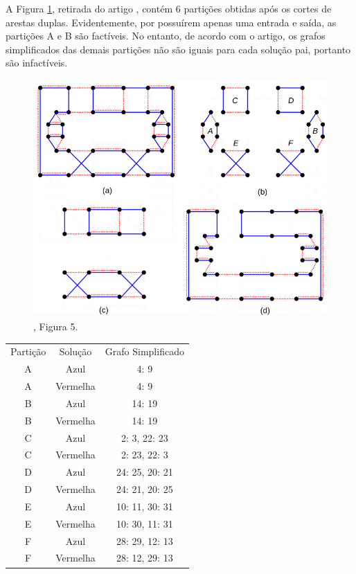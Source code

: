 \documentclass[
	article,			%
	11pt,				%
	oneside,			%
	a4paper,			%
	english,			%
	brazil,				%
	sumario=tradicional
	]{abntex2}
\begin{document}
A Figura \ref{fig-2}, retirada do artigo , contém 6 partições obtidas após os cortes de arestas duplas. Evidentemente, por possuírem apenas uma entrada e saída, as partições A e B são factíveis. No entanto, de acordo com o artigo, os grafos simplificados das demais partições não são iguais para cada solução pai, portanto são infactíveis.

\begin{figure}[tbph!]
	\centering
	\includegraphics[width=0.7\linewidth]{fig-2}
	\caption{, Figura 5.}
	\label{fig-2}
\end{figure}

\begin{table}[tbph!]
	\centering
	\label{tab-1}
	\begin{tabular}{ccc}
		Partição & Solução & Grafo Simplificado \\
		A & Azul & 4: 9 \\
		A & Vermelha & 4: 9 \\
		B & Azul & 14: 19 \\
		B & Vermelha & 14: 19 \\
		C & Azul & 2: 3, 22: 23 \\
		C & Vermelha & 2: 23, 22: 3 \\
		D & Azul & 24: 25, 20: 21 \\
		D & Vermelha & 24: 21, 20: 25 \\
		E & Azul & 10: 11, 30: 31 \\
		E & Vermelha & 10: 30, 11: 31 \\
		F & Azul & 28: 29, 12: 13 \\
		F & Vermelha & 28: 12, 29: 13
	\end{tabular}
\end{table}
\end{document}
